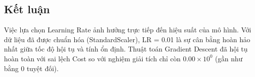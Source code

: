 \subsection{Kết luận}
Việc lựa chọn Learning Rate ảnh hưởng trực tiếp đến hiệu suất của mô hình. Với dữ liệu đã được chuẩn hóa (StandardScaler), LR = 0.01 là sự cân bằng hoàn hảo nhất giữa tốc độ hội tụ và tính ổn định. Thuật toán Gradient Descent đã hội tụ hoàn toàn với sai lệch Cost so với nghiệm giải tích chỉ còn \(0.00 \times 10^0\) (gần như bằng 0 tuyệt đối).
